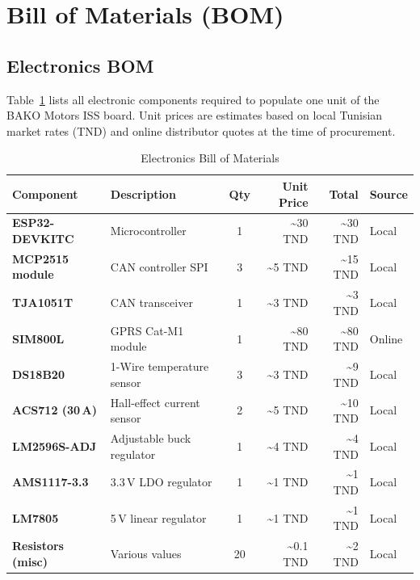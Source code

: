 \section{Bill of Materials (BOM)}

\subsection{Electronics BOM}

Table~\ref{tab:electronics-bom} lists all electronic components required to populate one unit of the BAKO Motors ISS board. Unit prices are estimates based on local Tunisian market rates (TND) and online distributor quotes at the time of procurement.

\begin{table}[H]
\centering
\caption{Electronics Bill of Materials}
\label{tab:electronics-bom}
\small
\begin{tabular}{>{\bfseries}p{3.0cm} p{3.6cm} c r r l}
\toprule
Component & Description & Qty & Unit Price & Total & Source \\
\midrule
ESP32-DEVKITC    & Microcontroller                & 1  & \textasciitilde30 TND  & \textasciitilde30 TND  & Local \\
MCP2515 module   & CAN controller SPI             & 3  & \textasciitilde5 TND   & \textasciitilde15 TND  & Local \\
TJA1051T         & CAN transceiver                & 1  & \textasciitilde3 TND   & \textasciitilde3 TND   & Local \\
SIM800L         & GPRS Cat-M1 module              & 1  & \textasciitilde80 TND  & \textasciitilde80 TND  & Online \\
DS18B20          & 1-Wire temperature sensor      & 3  & \textasciitilde3 TND   & \textasciitilde9 TND   & Local \\
ACS712 (30\,A)   & Hall-effect current sensor     & 2  & \textasciitilde5 TND   & \textasciitilde10 TND  & Local \\
LM2596S-ADJ      & Adjustable buck regulator      & 1  & \textasciitilde4 TND   & \textasciitilde4 TND   & Local \\
AMS1117-3.3      & 3.3\,V LDO regulator           & 1  & \textasciitilde1 TND   & \textasciitilde1 TND   & Local \\
LM7805           & 5\,V linear regulator          & 1  & \textasciitilde1 TND   & \textasciitilde1 TND   & Local \\
Resistors (misc) & Various values                 & 20 & \textasciitilde0.1 TND & \textasciitilde2 TND   & Local \\

\end{tabular}
\end{table}
